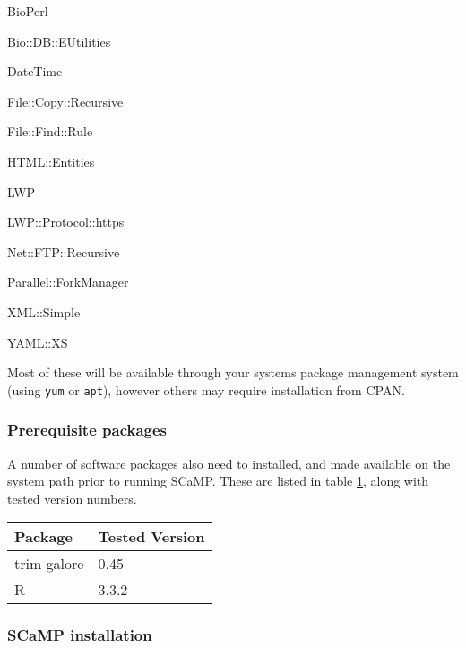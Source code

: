 \documentclass[a4paper,10pt]{article}
\newenvironment{tight_enumerate}{
\begin{enumerate}
  \setlength{\itemsep}{0pt}
  \setlength{\parskip}{0pt}
}{\end{enumerate}}
\begin{document}
\begin{tight_enumerate}
\item BioPerl                                          
\item Bio::DB::EUtilities                              
\item DateTime                                         
\item File::Copy::Recursive                            
\item File::Find::Rule                                 
\item HTML::Entities                                   
\item LWP                                              
\item LWP::Protocol::https                             
\item Net::FTP::Recursive                              
\item Parallel::ForkManager                           
\item XML::Simple                                     
\item YAML::XS            
\end{tight_enumerate}

Most of these will be available through your systems package management system
(using {\tt yum} or {\tt apt}), however others may require installation from
CPAN.  

\subsubsection{Prerequisite packages}

A number of software packages also need to installed, and made available on the
system path prior to running SCaMP. These are listed in table
\ref{tab:reqpack}, along with tested version numbers.

\begin{table}[htb]
\begin{tabular}{ll}
\hline
\textbf {Package} & \textbf {Tested Version}  \\
\hline
trim-galore        & 0.45 \\
R                  & 3.3.2 \\
\hline
\end{tabular}
\label{tab:reqpack}
\end{table}

\subsubsection{SCaMP installation}
\end{document}
